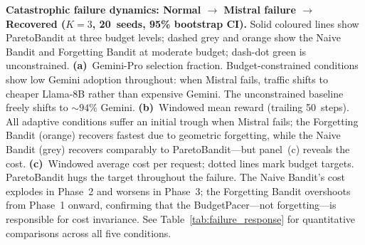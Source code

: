 
\textbf{Catastrophic failure dynamics: Normal $\to$ Mistral failure
$\to$ Recovered ($K{=}3$, 20~seeds, 95\% bootstrap CI).}
Solid coloured lines show ParetoBandit at three budget levels;
dashed grey and orange show the Naive Bandit and Forgetting Bandit
at moderate budget; dash-dot green is unconstrained.
%
\textbf{(a)}~Gemini-Pro selection fraction.  Budget-constrained
conditions show low Gemini adoption throughout: when Mistral
fails, traffic shifts to cheaper Llama-8B rather than expensive
Gemini.  The unconstrained baseline freely shifts to ${\sim}94\%$
Gemini.
%
\textbf{(b)}~Windowed mean reward (trailing 50~steps).  All adaptive
conditions suffer an initial trough when Mistral fails; the
Forgetting Bandit (orange) recovers fastest due to geometric
forgetting, while the Naive Bandit (grey) recovers comparably
to ParetoBandit---but panel~(c) reveals the cost.
%
\textbf{(c)}~Windowed average cost per request; dotted lines mark
budget targets.  ParetoBandit hugs the target throughout the failure.
The Naive Bandit's cost explodes in Phase~2 and worsens in Phase~3;
the Forgetting Bandit overshoots from Phase~1 onward, confirming
that the BudgetPacer---not forgetting---is responsible for cost
invariance.
See Table~\ref{tab:failure_response} for quantitative comparisons
across all five conditions.
